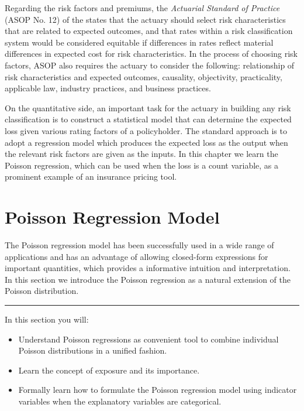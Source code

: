 \documentclass[]{book}
\providecommand{\tightlist}{%
  \setlength{\itemsep}{0pt}\setlength{\parskip}{0pt}}
\theoremstyle{definition}
\theoremstyle{definition}
\theoremstyle{definition}
\theoremstyle{remark}
\begin{document}
Regarding the risk factors and premiums, the \emph{Actuarial Standard of
Practice} (ASOP No. 12) of the \citet{ASBStandards} states that the
actuary should select risk characteristics that are related to expected
outcomes, and that rates within a risk classification system would be
considered equitable if differences in rates reflect material
differences in expected cost for risk characteristics. In the process of
choosing risk factors, ASOP also requires the actuary to consider the
following: relationship of risk characteristics and expected outcomes,
causality, objectivity, practicality, applicable law, industry
practices, and business practices.

On the quantitative side, an important task for the actuary in building
any risk classification is to construct a statistical model that can
determine the expected loss given various rating factors of a
policyholder. The standard approach is to adopt a regression model which
produces the expected loss as the output when the relevant risk factors
are given as the inputs. In this chapter we learn the Poisson
regression, which can be used when the loss is a count variable, as a
prominent example of an insurance pricing tool.

\section{Poisson Regression Model}\label{S:RC:PoissonRegression}

The Poisson regression model has been successfully used in a wide range
of applications and has an advantage of allowing closed-form expressions
for important quantities, which provides a informative intuition and
interpretation. In this section we introduce the Poisson regression as a
natural extension of the Poisson distribution.

\begin{center}\rule{0.5\linewidth}{\linethickness}\end{center}

In this section you will:

\begin{itemize}
\tightlist
\item
  Understand Poisson regressions as convenient tool to combine
  individual Poisson distributions in a unified fashion.
\item
  Learn the concept of exposure and its importance.\\
\item
  Formally learn how to formulate the Poisson regression model using
  indicator variables when the explanatory variables are categorical.
\end{itemize}
\end{document}
